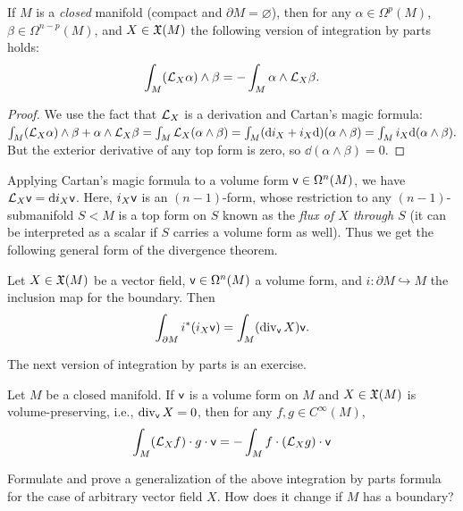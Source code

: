\begin{cor}
    If $M$ is a \emph{closed} manifold (compact and $\partial M=\varnothing$), then for any $\alpha\in\Omega^p(M)$, $\beta\in\Omega^{n-p}(M)$, and $X\in\mathfrak{X}(M)$ the following version of integration by parts holds:
    \[\int_M (\mathcal{L}_X \alpha)\wedge\beta=-\int_M \alpha\wedge\mathcal{L}_X\beta.\]
\end{cor}
\begin{proof}
    We use the fact that $\mathcal{L}_X$ is a derivation and Cartan's magic formula:
    $\int_M (\mathcal{L}_X\alpha)\wedge\beta+\alpha\wedge\mathcal{L}_X\beta=\int_M \mathcal{L}_X (\alpha\wedge\beta)=\int_M ({\mathrm{d}} i_X+i_X{\mathrm{d}})(\alpha\wedge\beta)=\int_M i_X {\mathrm{d}}(\alpha\wedge\beta).$
    But the exterior derivative of any top form is zero, so $\dd(\alpha\wedge\beta)=0$.
\end{proof}
Applying Cartan's magic formula to a volume form $\mathsf{v}\in\Omega^n(M)$, we have $\mathcal{L}_X\mathsf{v}={\mathrm{d}} i_X\mathsf{v}$. Here, $i_X\mathsf{v}$ is an $(n-1)$-form, whose restriction to any $(n-1)$-submanifold $S<M$ is a top form on $S$ known as the \emph{flux of $X$ through $S$} (it can be interpreted as a scalar if $S$ carries a volume form as well). Thus we get the following general form of the divergence theorem.
\begin{cor}
    Let $X\in\mathfrak{X}(M)$ be a vector field, $\mathsf{v}\in\Omega^n(M)$ a volume form, and $i:\partial M\hookrightarrow M$ the inclusion map for the boundary. Then 
    \[\int_{\partial M}i^\ast(i_X\mathsf{v})=\int_M (\operatorname{div}_{\mathsf{v}}X)\mathsf{v}.\]
\end{cor}
The next version of integration by parts is an exercise.
\begin{cor}
    Let $M$ be a closed manifold. If $\mathsf{v}$ is a volume form on $M$ and $X\in\mathfrak{X}(M)$ is volume-preserving, i.e., $\operatorname{div}_{\mathsf{v}} X=0$, then for any $f,g\in C^\infty(M)$,
    \[\int_M (\mathcal{L}_Xf)\cdot g\cdot \mathsf{v}=-\int_M f\cdot (\mathcal{L}_Xg)\cdot \mathsf{v}\]
\end{cor}
\begin{xca}
    Formulate and prove a generalization of the above  integration by parts formula for the case of arbitrary vector field $X$. How does it change if $M$ has a boundary?
\end{xca}

